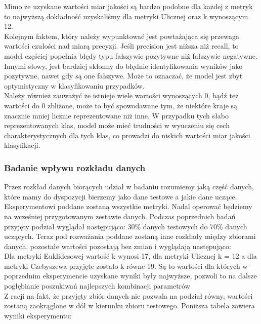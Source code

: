 \documentclass{article}
\begin{document}
\noindent Mimo że uzyskane wartości miar jakości są bardzo podobne dla każdej z metryk to najwyższą dokładność uzyskaliśmy dla metryki Ulicznej oraz k wynoszącym 12. \\

\noindent Kolejnym faktem, który należy wypunktować jest powtażająca się przewaga wartości czułości nad miarą precyzji. Jeśli precision jest niższa niż recall, to model częściej popełnia błędy typu fałszywie pozytywne niż fałszywie negatywne. Innymi słowy, jest bardziej skłonny do błędnie identyfikowania wyników jako pozytywne, nawet gdy są one fałszywe. Może to oznaczać, że model jest zbyt optymistyczny w klasyfikowaniu przypadków. \\

\noindent Należy również zauważyć że istnieje wiele wartości wynoszących 0, bądź też wartości do 0 zbliżone, może to być spowodawane tym, że niektóre kraje są znacznie mniej licznie reprezentowane niż inne. W przypadku tych słabo reprezentowanych klas, model może mieć trudności w wyuczeniu się cech charakterystycznych dla tych klas, co prowadzi do niskich wartości miar jakości klasyfikacji.

\subsubsection*{Badanie wpływu rozkładu danych}

Przez rozkład danych biorących udział w badaniu rozumiemy jaką część danych, które mamy do dyspozycji bierzemy jako dane testowe a jakie dane uczące. Eksperymentowi poddane zostaną wszystkie metryki. Nadal operować będziemy na wcześniej przygotowanym zestawie danych. Podczas poprzednich badań przyjęty podział wyglądał następująco: 30\% danych testowych do 70\% danych uczących. Teraz pod rozważania poddane zostaną inne rozkłady między zbiorami danych, pozostałe wartości pozostają bez zmian i wyglądają następująco: \\

\noindent Dla metryki Euklidesowej wartość k wynosi 17, dla metryki Ulicznej k = 12 a dla metryki Czebyszewa przyjęte zostało k równe 19. Są to wartości dla których w poprzednim eksperymencie uzyskane wyniki były najwyższe, pozwoli to na dalsze pogłębianie poszukiwań najlepszych kombinacji parametrów\\

\noindent Z racji na fakt, że przyjęty zbiór danych nie pozwala na podział równy, wartości zostaną zaokrąglone w dół w kierunku zbioru testowego. Poniższa tabela zawiera wyniki eksperymentu: 
\end{document}
